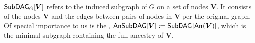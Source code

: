 $\subgraph[G]{\bm{V}}$ refers to the induced subgraph of $G$ on a set of nodes $\bm{V}$. It consists of the nodes $\bm{V}$ and the edges between pairs of nodes in $\bm{V}$ per the original graph. Of special importance to us is the %
, $\ansubgraph{\bm{V}}\coloneqq\subgraph{\An{\bm{V}}}$, which is the minimal subgraph containing the full ancestry of $\bm{V}$. 








